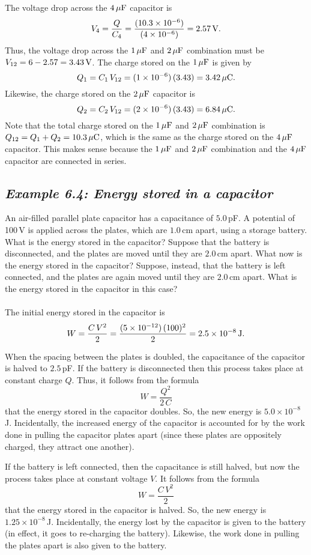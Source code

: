 The voltage drop across the $4\,\mu{\rm F}$ capacitor is 
$$
V_4 = \frac{Q}{C_4} = \frac{(10.3\times 10^{-6})}{(4\times 10^{-6})}=2.57\,{\rm V}.
$$
Thus, the voltage drop across the $1\,\mu{\rm F}$ and  $2\,\mu{\rm F}$ combination
must be $V_{12}=6-2.57 = 3.43\,{\rm V}$. The charge stored on the $1\,\mu{\rm F}$ 
is given by
$$
Q_1 = C_1\,V_{12} = (1\times 10^{-6})\,(3.43) = 3.42\,\mu{\rm C}.
$$
Likewise, the charge stored on the $2\,\mu{\rm F}$ capacitor is
$$
Q_2 = C_2\,V_{12} = (2\times 10^{-6})\,(3.43) = 6.84\,\mu{\rm C}.
$$
Note that the total charge stored on the $1\,\mu{\rm F}$ and  $2\,\mu{\rm F}$ combination
is $Q_{12} = Q_1+Q_2 = 10.3\,\mu{\rm C}$, which is the same as the charge
stored on the $4\,\mu{\rm F}$ capacitor. This makes sense because the $1\,\mu{\rm F}$ and  $2\,\mu{\rm F}$ combination
and the  $4\,\mu{\rm F}$ capacitor are connected in series.


\subsection*{\em Example 6.4: Energy stored in a capacitor}
An air-filled parallel plate capacitor has a capacitance of $5.0$\,pF. A potential
of 100\,V is applied across the plates, which are $1.0$\,cm apart, using a
storage battery. What is the energy stored in the capacitor? Suppose that
the battery is disconnected, and the plates are moved until they are $2.0$\,cm
apart. What now is the energy stored in the capacitor? Suppose, instead, that
the battery is left connected, and the plates are again moved until they are
$2.0$\,cm apart. What is the energy stored in the capacitor in this case?\\
~\\
 The initial energy stored in the
capacitor is
$$
W = \frac{C\,V^2}{2} = \frac{(5\times 10^{-12})\,(100)^2}{2}= 2.5\times 10^{-8}
\,{\rm J}.
$$

When the spacing between the plates is doubled, the capacitance of the capacitor
is halved to $2.5$\,pF. If the battery is disconnected then this process
takes place at constant charge $Q$. Thus, it follows from the
formula
$$
W = \frac{Q^2}{2\,C}
$$
that  the energy stored in the capacitor doubles. So, the
new energy is $5.0\times 10^{-8}$\,J. Incidentally, the increased energy
of the capacitor is accounted for by  the work done in pulling 
the capacitor plates apart (since these plates  are oppositely charged,
they attract one another). 

If the battery is left connected, then the capacitance is still halved, but now
the process takes place at constant voltage $V$. It follows from the
formula
$$
W = \frac{C\,V^2}{2}
$$
that  the energy stored in the capacitor is halved. 
So, the new energy is $1.25\times 10^{-8}$\,J. Incidentally, the energy lost
by the capacitor is given to the battery (in effect, it goes to re-charging the
battery). Likewise, the work done in pulling the plates apart is
also given to the battery. 
